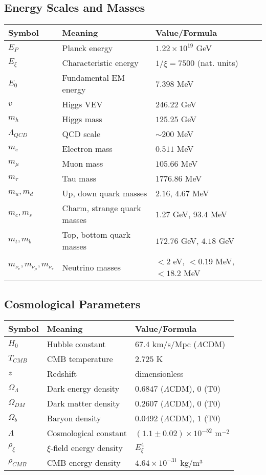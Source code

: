 \documentclass[12pt,a4paper]{article}
\begin{document}
\subsection{Energy Scales and Masses}
\begin{longtable}{lll}
	\toprule
	\textbf{Symbol} & \textbf{Meaning} & \textbf{Value/Formula} \\
	\midrule
	$E_P$ & Planck energy & $1.22 \times 10^{19}$ GeV \\
	$E_\xi$ & Characteristic energy & $1/\xi = 7500$ (nat. units) \\
	$E_0$ & Fundamental EM energy & $7.398$ MeV \\
	$v$ & Higgs VEV & $246.22$ GeV \\
	$m_h$ & Higgs mass & $125.25$ GeV \\
	$\Lambda_{QCD}$ & QCD scale & $\sim 200$ MeV \\
	$m_e$ & Electron mass & $0.511$ MeV \\
	$m_\mu$ & Muon mass & $105.66$ MeV \\
	$m_\tau$ & Tau mass & $1776.86$ MeV \\
	$m_u, m_d$ & Up, down quark masses & $2.16$, $4.67$ MeV \\
	$m_c, m_s$ & Charm, strange quark masses & $1.27$ GeV, $93.4$ MeV \\
	$m_t, m_b$ & Top, bottom quark masses & $172.76$ GeV, $4.18$ GeV \\
	$m_{\nu_e}, m_{\nu_\mu}, m_{\nu_\tau}$ & Neutrino masses & $< 2$ eV, $< 0.19$ MeV, $< 18.2$ MeV \\
	\bottomrule
\end{longtable}

\subsection{Cosmological Parameters}
\begin{longtable}{lll}
	\toprule
	\textbf{Symbol} & \textbf{Meaning} & \textbf{Value/Formula} \\
	\midrule
	$H_0$ & Hubble constant & $67.4$ km/s/Mpc ($\Lambda$CDM) \\
	$T_{CMB}$ & CMB temperature & $2.725$ K \\
	$z$ & Redshift & dimensionless \\
	$\Omega_\Lambda$ & Dark energy density & $0.6847$ ($\Lambda$CDM), $0$ (T0) \\
	$\Omega_{DM}$ & Dark matter density & $0.2607$ ($\Lambda$CDM), $0$ (T0) \\
	$\Omega_b$ & Baryon density & $0.0492$ ($\Lambda$CDM), $1$ (T0) \\
	$\Lambda$ & Cosmological constant & $(1.1 \pm 0.02) \times 10^{-52}$ m$^{-2}$ \\
	$\rho_\xi$ & $\xi$-field energy density & $E_\xi^4$ \\
	$\rho_{CMB}$ & CMB energy density & $4.64 \times 10^{-31}$ kg/m³ \\
	\bottomrule
\end{longtable}
\end{document}

